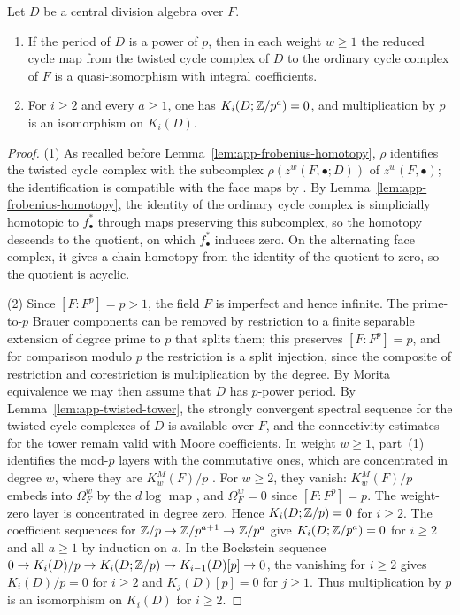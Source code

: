 \begin{proposition}\label{prop:app-frobenius}
Let $D$ be a central division algebra over $F$.
\begin{enumerate}
\item If the period of $D$ is a power of $p$, then in each weight $w\ge1$ the reduced cycle map from the twisted cycle complex of $D$ to the ordinary cycle complex of $F$ is a quasi-isomorphism with integral coefficients.
\item For $i\ge2$ and every $a\ge1$, one has $K_i(D;\mathbb Z/p^a)=0$, and multiplication by $p$ is an isomorphism on $K_i(D)$.
\end{enumerate}
\end{proposition}
\begin{proof}
(1) As recalled before Lemma~\ref{lem:app-frobenius-homotopy}, $\rho$ identifies the twisted cycle complex with the subcomplex $\rho(z^w(F,\bullet;D))$ of $z^w(F,\bullet)$; the identification is compatible with the face maps by \cite[Lemma 5.9.1]{KahnLevine2010}.
By Lemma~\ref{lem:app-frobenius-homotopy}, the identity of the ordinary cycle complex is simplicially homotopic to $f_\bullet^*$ through maps preserving this subcomplex, so the homotopy descends to the quotient, on which $f_\bullet^*$ induces zero.
On the alternating face complex, it gives a chain homotopy from the identity of the quotient to zero, so the quotient is acyclic.

(2) Since $[F:F^p]=p>1$, the field $F$ is imperfect and hence infinite.
The prime-to-$p$ Brauer components can be removed by restriction to a finite separable extension of degree prime to $p$ that splits them; this preserves $[F:F^p]=p$, and for comparison modulo $p$ the restriction is a split injection, since the composite of restriction and corestriction is multiplication by the degree.
By Morita equivalence we may then assume that $D$ has $p$-power period.
By Lemma~\ref{lem:app-twisted-tower}, the strongly convergent spectral sequence for the twisted cycle complexes of $D$ is available over $F$, and the connectivity estimates for the tower remain valid with Moore coefficients.
In weight $w\ge1$, part~(1) identifies the mod-$p$ layers with the commutative ones, which are concentrated in degree $w$, where they are $K_w^M(F)/p$ \cite{GeisserLevine}.
For $w\ge2$, they vanish: $K_w^M(F)/p$ embeds into $\Omega^w_F$ by the $d\log$ map \cite[Corollary (2.8)]{BlochKato1986}, and $\Omega^w_F=0$ since $[F:F^p]=p$.
The weight-zero layer is concentrated in degree zero.
Hence $K_i(D;\mathbb Z/p)=0$ for $i\ge2$.
The coefficient sequences for $\mathbb Z/p\to\mathbb Z/p^{a+1}\to\mathbb Z/p^a$ give $K_i(D;\mathbb Z/p^a)=0$ for $i\ge2$ and all $a\ge1$ by induction on $a$.
In the Bockstein sequence $0\to K_i(D)/p\to K_i(D;\mathbb Z/p)\to K_{i-1}(D)[p]\to0$, the vanishing for $i\ge2$ gives $K_i(D)/p=0$ for $i\ge2$ and $K_j(D)[p]=0$ for $j\ge1$.
Thus multiplication by $p$ is an isomorphism on $K_i(D)$ for $i\ge2$.
\end{proof}
